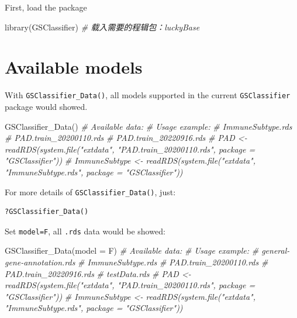 \documentclass[
  12pt,
]{book}
\newenvironment{Shaded}{\begin{snugshade}}{\end{snugshade}}
\newcommand{\AttributeTok}[1]{\textcolor[rgb]{0.77,0.63,0.00}{#1}}
\newcommand{\CommentTok}[1]{\textcolor[rgb]{0.56,0.35,0.01}{\textit{#1}}}
\newcommand{\FunctionTok}[1]{\textcolor[rgb]{0.00,0.00,0.00}{#1}}
\newcommand{\NormalTok}[1]{#1}
\begin{document}
First, load the package

\begin{Shaded}
\begin{Highlighting}[]
\FunctionTok{library}\NormalTok{(GSClassifier)}
\CommentTok{\# 载入需要的程辑包：luckyBase}
\end{Highlighting}
\end{Shaded}

\hypertarget{available-models}{%
\section{Available models}\label{available-models}}

With \texttt{GSClassifier\_Data()}, all models supported in the current \texttt{GSClassifier} package would showed.

\begin{Shaded}
\begin{Highlighting}[]
\FunctionTok{GSClassifier\_Data}\NormalTok{()}
\CommentTok{\# Available data:}
\CommentTok{\# Usage example:}
\CommentTok{\#   ImmuneSubtype.rds }
\CommentTok{\#   PAD.train\_20200110.rds }
\CommentTok{\#   PAD.train\_20220916.rds }
\CommentTok{\#   PAD \textless{}{-} readRDS(system.file("extdata", "PAD.train\_20200110.rds", package = "GSClassifier")) }
\CommentTok{\#   ImmuneSubtype \textless{}{-} readRDS(system.file("extdata", "ImmuneSubtype.rds", package = "GSClassifier"))}
\end{Highlighting}
\end{Shaded}

For more details of \texttt{GSClassifier\_Data()}, just:

\begin{verbatim}
?GSClassifier_Data()
\end{verbatim}

Set \texttt{model=F}, all \texttt{.rds} data would be showed:

\begin{Shaded}
\begin{Highlighting}[]
\FunctionTok{GSClassifier\_Data}\NormalTok{(}\AttributeTok{model =}\NormalTok{ F)}
\CommentTok{\# Available data:}
\CommentTok{\# Usage example:}
\CommentTok{\#   general{-}gene{-}annotation.rds }
\CommentTok{\#   ImmuneSubtype.rds }
\CommentTok{\#   PAD.train\_20200110.rds }
\CommentTok{\#   PAD.train\_20220916.rds }
\CommentTok{\#   testData.rds }
\CommentTok{\#   PAD \textless{}{-} readRDS(system.file("extdata", "PAD.train\_20200110.rds", package = "GSClassifier")) }
\CommentTok{\#   ImmuneSubtype \textless{}{-} readRDS(system.file("extdata", "ImmuneSubtype.rds", package = "GSClassifier"))}
\end{Highlighting}
\end{Shaded}
\end{document}
